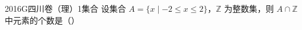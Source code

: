 
\begin{problem}{2016}{G}{四川卷（理）}{1}{集合}
设集合 $ A = \{x \mid -2 \leq x \leq 2\} $，$ \mathbb{Z} $ 为整数集，则 $ A \cap \mathbb{Z} $ 中元素的个数是（\hspace{1cm}）
\begin{choices}
\end{choices}
\end{problem}

\begin{answer}

\end{answer}

\begin{solutions}

\end{solutions}
